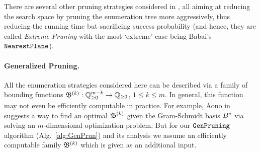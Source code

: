 There are several other pruning strategies considered in \cite{EC:GamNguReg10}, all aiming at reducing the search space by pruning the enumeration tree more aggressively, thus reducing the running time but sacrificing success probability (and hence, they are called \emph{Extreme Pruning} with the most `extreme' case being Babai's $\texttt{NearestPlane}$). 
\vspace{10pt} %
\paragraph{Generalized Pruning.} All the enumeration strategies considered here can be described via a family of bounding functions $\mathfrak{B}^{(k)}: \mathbb{Q}_{\geq 0}^{m-k} \rightarrow \mathbb{Q}_{\geq 0}$, $1 \leq k \leq m$. In general, this function may not even be efficiently computable in practice. For example, Aono in \cite{Ao14} suggests a way to find an optimal $\mathfrak{B}^{(k)}$ given the Gram-Schmidt basis $B^*$ via solving an $m$-dimensional optimization problem. But for our $\texttt{GenPruning}$ algorithm (Alg.~\ref{alg:GenPrun}) and its analysis we assume an efficiently computable family $\mathfrak{B}^{(k)}$ which is given as an additional input.

